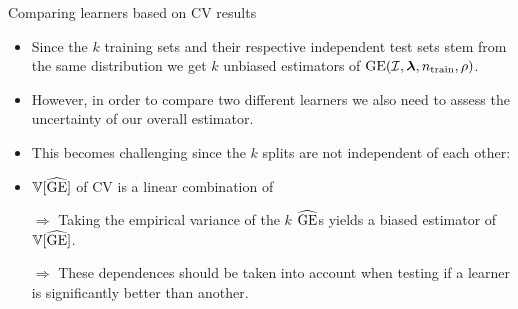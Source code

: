 \begin{vbframe}{Comparing learners based on CV results}
\begin{footnotesize}
\begin{itemize}
\item Since the $k$ training sets and their respective independent test sets stem
from the same distribution we get $k$ unbiased estimators of $\mathrm{GE}(\mathcal{I}, \bm{\lambda}, n_{\mathrm{train}}, \rho)$.
\item However, in order to compare two different learners we also need to assess the 
uncertainty of our overall  estimator.
\item This becomes challenging since the $k$ splits are not independent of each other: 
\item $\mathbb{V}[\widehat{\mathrm{GE}}]$ of CV is a linear combination of 
\begin{itemize}
\end{itemize}
\item[$\Rightarrow$] Taking the empirical variance of the $k$ $\widehat{\mathrm{GE}}$s yields a biased 
estimator of $\mathbb{V}[\widehat{\mathrm{GE}}]$.
\item[$\Rightarrow$] These dependences should be taken into account 
when testing if a learner is significantly better than another. 

\end{itemize}
\end{footnotesize}
\end{vbframe}



